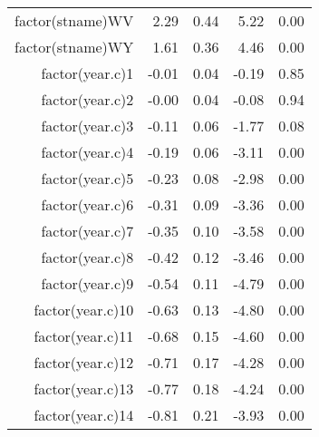 \begin{table}[ht]
\begin{tabular}{rrrrr}
  factor(stname)WV & 2.29 & 0.44 & 5.22 & 0.00 \\ 
  factor(stname)WY & 1.61 & 0.36 & 4.46 & 0.00 \\ 
  factor(year.c)1 & -0.01 & 0.04 & -0.19 & 0.85 \\ 
  factor(year.c)2 & -0.00 & 0.04 & -0.08 & 0.94 \\ 
  factor(year.c)3 & -0.11 & 0.06 & -1.77 & 0.08 \\ 
  factor(year.c)4 & -0.19 & 0.06 & -3.11 & 0.00 \\ 
  factor(year.c)5 & -0.23 & 0.08 & -2.98 & 0.00 \\ 
  factor(year.c)6 & -0.31 & 0.09 & -3.36 & 0.00 \\ 
  factor(year.c)7 & -0.35 & 0.10 & -3.58 & 0.00 \\ 
  factor(year.c)8 & -0.42 & 0.12 & -3.46 & 0.00 \\ 
  factor(year.c)9 & -0.54 & 0.11 & -4.79 & 0.00 \\ 
  factor(year.c)10 & -0.63 & 0.13 & -4.80 & 0.00 \\ 
  factor(year.c)11 & -0.68 & 0.15 & -4.60 & 0.00 \\ 
  factor(year.c)12 & -0.71 & 0.17 & -4.28 & 0.00 \\ 
  factor(year.c)13 & -0.77 & 0.18 & -4.24 & 0.00 \\ 
  factor(year.c)14 & -0.81 & 0.21 & -3.93 & 0.00 \\ 
   \hline
\end{tabular}
\end{table}
